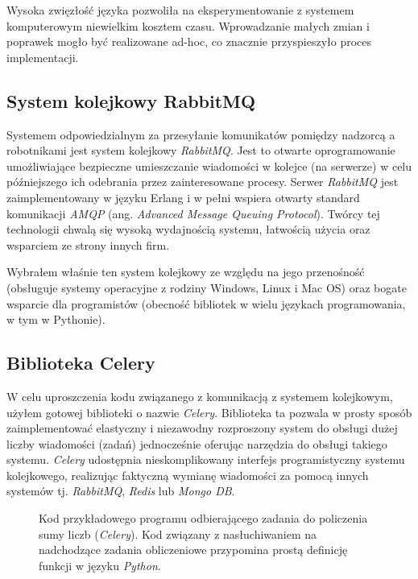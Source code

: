 \documentclass[../thesis.tex]{subfiles}
\begin{document}
Wysoka zwięzłość języka pozwoliła na eksperymentowanie z systemem komputerowym niewielkim kosztem czasu. Wprowadzanie małych zmian i poprawek mogło być realizowane ad-hoc, co znacznie przyspieszyło proces implementacji.

\subsection{System kolejkowy RabbitMQ}

Systemem odpowiedzialnym za przesyłanie komunikatów pomiędzy nadzorcą a robotnikami jest system kolejkowy \emph{RabbitMQ}. Jest to otwarte oprogramowanie umożliwiające bezpieczne umieszczanie wiadomości w kolejce (na serwerze) w celu późniejszego ich odebrania przez zainteresowane procesy. Serwer \emph{RabbitMQ} jest zaimplementowany w języku Erlang i w pełni wspiera otwarty standard komunikacji \emph{AMQP} (ang. \emph{Advanced Message Queuing Protocol}). Twórcy tej technologii chwalą się wysoką wydajnością systemu, łatwością użycia oraz wsparciem ze strony innych firm.

Wybrałem właśnie ten system kolejkowy ze względu na jego przenośność (obsługuje systemy operacyjne z rodziny Windows, Linux i Mac OS) oraz bogate wsparcie dla programistów (obecność bibliotek w wielu językach programowania, w tym w Pythonie).

\subsection{Biblioteka Celery}

W celu uproszczenia kodu związanego z komunikacją z systemem kolejkowym, użyłem gotowej biblioteki o nazwie \emph{Celery}. Biblioteka ta pozwala w prosty sposób zaimplementować elastyczny i niezawodny rozproszony system do obsługi dużej liczby wiadomości (zadań) jednocześnie oferując narzędzia do obsługi takiego systemu. \emph{Celery} udostępnia nieskomplikowany interfejs programistyczny systemu kolejkowego, realizując faktyczną wymianę wiadomości za pomocą innych systemów tj. \emph{RabbitMQ}, \emph{Redis} lub \emph{Mongo DB}. 

\begin{figure}[h]
\centering
{}

\caption{Kod przykładowego programu odbierającego zadania do policzenia sumy liczb (\emph{Celery}). Kod związany z nasłuchiwaniem na nadchodzące zadania obliczeniowe przypomina prostą definicję funkcji w języku \emph{Python}.}
\label{impl:snippet_celery}
\end{figure}
\end{document}
